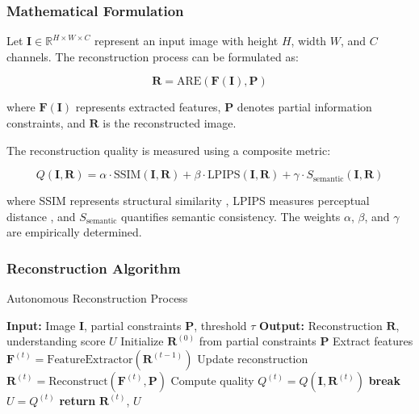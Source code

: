 \documentclass[12pt,a4paper]{article}
\begin{document}
\subsubsection{Mathematical Formulation}

Let $\mathbf{I} \in \mathbb{R}^{H \times W \times C}$ represent an input image with height $H$, width $W$, and $C$ channels. The reconstruction process can be formulated as:

\begin{equation}
\mathbf{R} = \text{ARE}(\mathbf{F}(\mathbf{I}), \mathbf{P})
\end{equation}

where $\mathbf{F}(\mathbf{I})$ represents extracted features, $\mathbf{P}$ denotes partial information constraints, and $\mathbf{R}$ is the reconstructed image.

The reconstruction quality is measured using a composite metric:

\begin{equation}
Q(\mathbf{I}, \mathbf{R}) = \alpha \cdot \text{SSIM}(\mathbf{I}, \mathbf{R}) + \beta \cdot \text{LPIPS}(\mathbf{I}, \mathbf{R}) + \gamma \cdot S_{\text{semantic}}(\mathbf{I}, \mathbf{R})
\end{equation}

where SSIM represents structural similarity \cite{wang2004image}, LPIPS measures perceptual distance \cite{zhang2018unreasonable}, and $S_{\text{semantic}}$ quantifies semantic consistency. The weights $\alpha$, $\beta$, and $\gamma$ are empirically determined.

\subsubsection{Reconstruction Algorithm}

\begin{algorithm}
\caption{Autonomous Reconstruction Process}
\begin{algorithmic}
\STATE \textbf{Input:} Image $\mathbf{I}$, partial constraints $\mathbf{P}$, threshold $\tau$
\STATE \textbf{Output:} Reconstruction $\mathbf{R}$, understanding score $U$
\STATE Initialize $\mathbf{R}^{(0)}$ from partial constraints $\mathbf{P}$
    \STATE Extract features $\mathbf{F}^{(t)} = \text{FeatureExtractor}(\mathbf{R}^{(t-1)})$
    \STATE Update reconstruction $\mathbf{R}^{(t)} = \text{Reconstruct}(\mathbf{F}^{(t)}, \mathbf{P})$
    \STATE Compute quality $Q^{(t)} = Q(\mathbf{I}, \mathbf{R}^{(t)})$
        \STATE \textbf{break}
    \ENDIF
\ENDFOR
\STATE $U = Q^{(t)}$
\STATE \textbf{return} $\mathbf{R}^{(t)}$, $U$
\end{algorithmic}
\end{algorithm}
\end{document}
